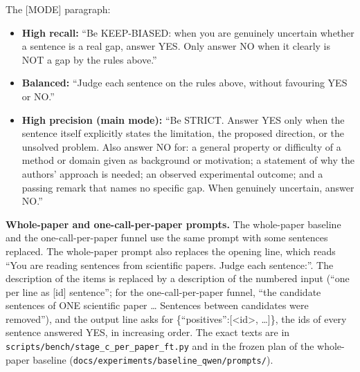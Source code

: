 \noindent The [MODE] paragraph:
\begin{itemize}
  \item \textbf{High recall:} ``Be KEEP-BIASED: when you are genuinely uncertain whether a sentence is a real gap, answer YES. Only answer NO when it clearly is NOT a gap by the rules above.''
  \item \textbf{Balanced:} ``Judge each sentence on the rules above, without favouring YES or NO.''
  \item \textbf{High precision (main mode):} ``Be STRICT. Answer YES only when the sentence itself explicitly states the limitation, the proposed direction, or the unsolved problem. Also answer NO for: a general property or difficulty of a method or domain given as background or motivation; a statement of why the authors' approach is needed; an observed experimental outcome; and a passing remark that names no specific gap. When genuinely uncertain, answer NO.''
\end{itemize}

\noindent\textbf{Whole-paper and one-call-per-paper prompts.} The whole-paper baseline and the one-call-per-paper funnel use the same prompt with some sentences replaced. The whole-paper prompt also replaces the opening line, which reads ``You are reading sentences from scientific papers. Judge each sentence:''. The description of the items is replaced by a description of the numbered input (``one per line as [id] sentence''; for the one-call-per-paper funnel, ``the candidate sentences of ONE scientific paper \ldots{} Sentences between candidates were removed''), and the output line asks for \{``positives'':[\textless id\textgreater, \ldots]\}, the ids of every sentence answered YES, in increasing order. The exact texts are in \texttt{scripts/bench/stage\_c\_per\_paper\_ft.py} and in the frozen plan of the whole-paper baseline (\texttt{docs/experiments/baseline\_qwen/prompts/}).
